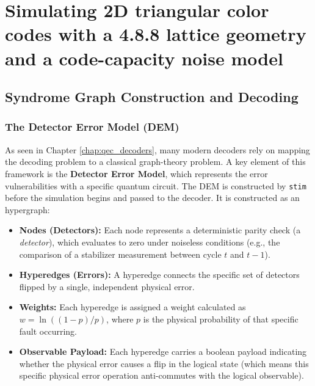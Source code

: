 \chapter{Simulating 2D triangular color codes with a 4.8.8 lattice geometry and a code-capacity noise model}
\label{chap:simulating_2d_color_codes}

\section{Syndrome Graph Construction and Decoding}
\label{sec:stim_pymatching_architecture}

\subsection{The Detector Error Model (DEM)}
As seen in Chapter \ref{chap:qec_decoders}, many modern decoders rely on mapping the decoding problem to a classical graph-theory problem. A key element of this framework is the \textbf{Detector Error Model}, which represents the error vulnerabilities with a specific quantum circuit. The DEM is constructed by \texttt{stim} before the simulation begins and passed to the decoder. It is constructed as an hypergraph:

\begin{itemize}
    \item {} \textbf{Nodes (Detectors):} Each node represents a deterministic parity check (a \textit{detector}), which evaluates to zero under noiseless conditions (e.g., the comparison of a stabilizer measurement between cycle $t$ and $t-1$).
    \item \textbf{Hyperedges (Errors):} A hyperedge connects the specific set of detectors flipped by a single, independent physical error. 
    \item \textbf{Weights:} Each hyperedge is assigned a weight calculated as $w = \ln((1-p)/p)$, where $p$ is the physical probability of that specific fault occurring.
    \item \textbf{Observable Payload:} Each hyperedge carries a boolean payload indicating whether the physical error causes a flip in the logical state (which means this specific physical error operation anti-commutes with the logical observable).
\end{itemize}

